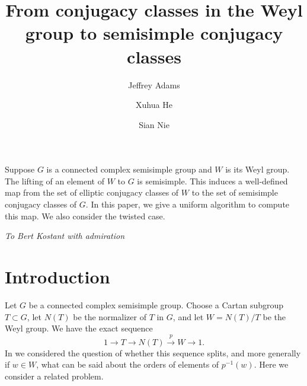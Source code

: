 \documentclass[10pt,leqno]{article}
\renewcommand{\sec}[1]{\section{#1}
\renewcommand{\theequation}{\thesection.\arabic{equation}}
  \setcounter{equation}{0}}
\newcommand\inv{^{-1}}
\renewcommand{\sec}[1]{\section{#1}
\renewcommand{\theequation}{\thesection.\arabic{equation}}
  \setcounter{equation}{0}}
\begin{document}
\author{Jeffrey Adams}
\author{Xuhua He}
\author{Sian Nie}
\date{}                     %


\title{From conjugacy classes in  the Weyl group to semisimple conjugacy classes}


\maketitle

\let\thefootnote\relax{}

\let\thefootnote\relax{}

\let\thefootnote\relax{}

 Suppose $G$ is a connected complex semisimple group
and $W$ is its Weyl group. The lifting of an element of $W$ to $G$ is
semisimple. This induces a well-defined map from the set of elliptic
conjugacy classes of $W$ to the set of semisimple conjugacy classes of
$G$. In this paper, we give a uniform algorithm to compute this
map. We also consider the twisted case.

\begin{center}

  
  \large \emph{To Bert Kostant with admiration}
  \end{center}

\sec{Introduction}

Let $G$ be a connected complex semisimple group.
Choose a Cartan subgroup $T\subset G$, let $N(T)$ be the normalizer of $T$ in $G$,
and let $W=N(T)/T$ be the Weyl group.
We have the exact sequence
\begin{equation}
\label{e:exactW}
1\rightarrow T\rightarrow N(T)\overset p\rightarrow W\rightarrow 1.
\end{equation}
In \cite{AH} we considered the question of whether this sequence splits,
and more generally if $w\in W$, what can be said about the orders of elements of $p\inv(w)$.
Here we consider a related problem.
\end{document}
